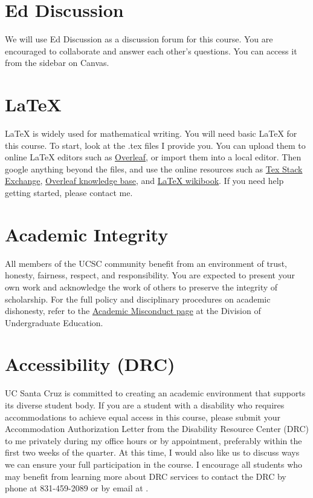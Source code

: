 \documentclass[12pt]{article}
\begin{document}
\section{Ed Discussion}
We will use Ed Discussion as a discussion forum for this course. You are encouraged to collaborate and answer each other's questions. You can access it from the sidebar on Canvas.

\section{\LaTeX}
{\LaTeX} is widely used for mathematical writing. You will need basic {\LaTeX} for this course. To start, look at the .tex files I provide you. You can upload them to online {\LaTeX} editors such as \href{https://www.overleaf.com/}{Overleaf}, or import them into a local editor. 
Then google anything beyond the files, and use the online resources such as \href{https://tex.stackexchange.com/}{Tex Stack Exchange}, \href{https://www.overleaf.com/learn}{Overleaf knowledge base}, and \href{https://en.wikibooks.org/wiki/LaTeX}{{\LaTeX} wikibook}. If you need help getting started, please contact me. 

\section{Academic Integrity} 
All members of the UCSC community benefit from an environment of trust, honesty, fairness, respect, and responsibility. You are expected to present your own work and acknowledge the work of others to preserve the integrity of scholarship. For the full policy and disciplinary procedures on academic dishonesty, refer to the \href{https://ue.ucsc.edu/academic-misconduct.html}{Academic Misconduct page} at the Division of Undergraduate Education. 

\section{Accessibility (DRC)} 
UC Santa Cruz is committed to creating an academic environment that supports its diverse student body. If you are a student with a disability who requires accommodations to achieve equal access in this course, please submit your Accommodation Authorization Letter from the Disability Resource Center (DRC) to me privately during my office hours or by appointment, preferably within the first two weeks of the quarter. At this time, I would also like us to discuss ways we can ensure your full participation in the course. I encourage all students who may benefit from learning more about DRC services to contact the DRC by phone at 831-459-2089 or by email at .
\end{document}
